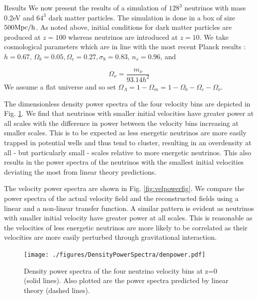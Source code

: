 \begin{section}{Results}
  \label{sec:results}
  We now present the results of a simulation of $128^3$ neutrinos 
with mass 0.2eV and $64^3$ dark matter particles. The simulation 
is done in a box of size $500 \mbox{Mpc}/\mbox{h}{}$. As noted above, initial 
conditions for dark matter particles are produced at $z=100$ 
whereas neutrinos are introduced at $z=10$. We take cosmological 
parameters which are in line with the most recent Planck results 
\cite{bib:Planck2015}: $h=0.67,\, \Omega_b=0.05, \Omega_c=0.27, 
\sigma_8=0.83,\, n_s=0.96 $, and

\begin{equation}
  \Omega_\nu = \frac{m_\nu}{93.14 h^2}
\end{equation}
We assume a flat universe and so set $\Omega_\Lambda=1-\Omega_m=1-\Omega_b-\Omega_c-\Omega_\nu$.

\par The dimensionless density power spectra of the four velocity 
bins are depicted in Fig. \ref{fig:denpowerfig}. We find that 
neutrinos with smaller initial velocities have greater power at all scales 
with the difference in power between the velocity bins increasing at smaller scales. 
This is to be expected as less energetic neutrinos are more easily trapped 
in potential wells and thus tend to cluster, resulting in an overdensity at all -
but particularly small - scales relative to more energetic neutrinos. 
This also results in the power spectra of the neutrinos with the 
smallest initial velocities deviating the most from linear theory predictions. 

\par The velocity power spectra are shown in Fig. \ref{fig:velpowerfig}. 
We compare the power spectra of the actual velocity field and the reconstructed
fields using a linear and a non-linear transfer function. 
A similar pattern is evident as neutrinos with smaller initial velocity have
greater power at all scales. This is reasonable as the velocities of 
less energetic neutrinos are more likely to be correlated as their 
velocities are more easily perturbed through gravitational interaction. 

\begin{figure}[htbp]
  \begin{center}
    \texttt{[image: ./figures/DensityPowerSpectra/denpower.pdf]}
    \caption{Density power spectra of the four neutrino velocity bins
	      at z=0 (solid lines). Also plotted are the power spectra predicted by
	      linear theory (dashed lines).}
    \label{fig:denpowerfig}
  \end{center}
\end{figure}


\end{section}
